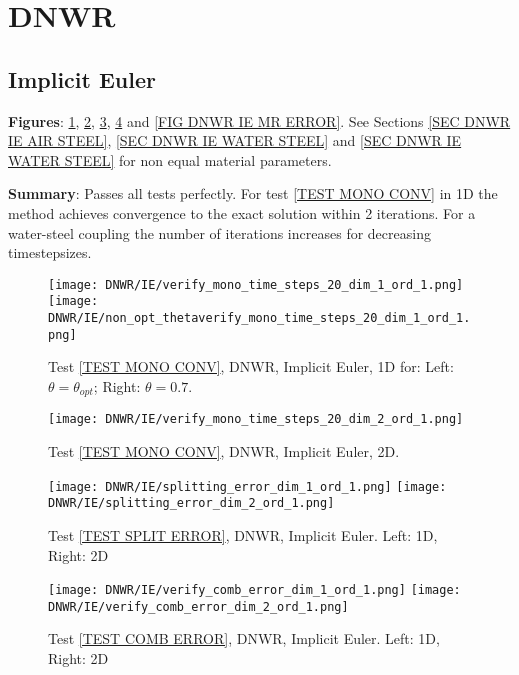 \documentclass[a4paper,10pt]{article}
\begin{document}
\section{DNWR}\label{SEC DNWR}
%
\subsection{Implicit Euler}\label{SEC DNWR IE}
% 
\textbf{Figures}: \ref{FIG DNWR IE 1D MONO CONV}, \ref{FIG DNWR IE 2D MONO CONV}, \ref{FIG DNWR IE SPLIT ERROR}, \ref{FIG DNWR IE COMB ERROR} and \ref{FIG DNWR IE MR ERROR}. See Sections \ref{SEC DNWR IE AIR STEEL}, \ref{SEC DNWR IE WATER STEEL} and \ref{SEC DNWR IE WATER STEEL} for non equal material parameters.

\textbf{Summary}: Passes all tests perfectly. For test \ref{TEST MONO CONV} in 1D the method achieves convergence to the exact solution within 2 iterations. For a water-steel coupling the number of iterations increases for decreasing timestepsizes.
% 
\begin{figure}[!ht]
\texttt{[image: DNWR/IE/verify\_mono\_time\_steps\_20\_dim\_1\_ord\_1.png]}
\texttt{[image: DNWR/IE/non\_opt\_thetaverify\_mono\_time\_steps\_20\_dim\_1\_ord\_1.png]}
\caption{Test \ref{TEST MONO CONV}, DNWR, Implicit Euler, 1D for: Left: $\theta = \theta_{opt}$; Right: $\theta = 0.7$.}
\label{FIG DNWR IE 1D MONO CONV}
\end{figure}

\begin{figure}[!ht]
\texttt{[image: DNWR/IE/verify\_mono\_time\_steps\_20\_dim\_2\_ord\_1.png]}
\caption{Test \ref{TEST MONO CONV}, DNWR, Implicit Euler, 2D.}
\label{FIG DNWR IE 2D MONO CONV}
\end{figure}

\begin{figure}[!ht]
\texttt{[image: DNWR/IE/splitting\_error\_dim\_1\_ord\_1.png]}
\texttt{[image: DNWR/IE/splitting\_error\_dim\_2\_ord\_1.png]}
\caption{Test \ref{TEST SPLIT ERROR}, DNWR, Implicit Euler. Left: 1D, Right: 2D}
\label{FIG DNWR IE SPLIT ERROR}
\end{figure}

\begin{figure}[!ht]
\texttt{[image: DNWR/IE/verify\_comb\_error\_dim\_1\_ord\_1.png]}
\texttt{[image: DNWR/IE/verify\_comb\_error\_dim\_2\_ord\_1.png]}
\caption{Test \ref{TEST COMB ERROR}, DNWR, Implicit Euler. Left: 1D, Right: 2D}
\label{FIG DNWR IE COMB ERROR}
\end{figure}
\end{document}
